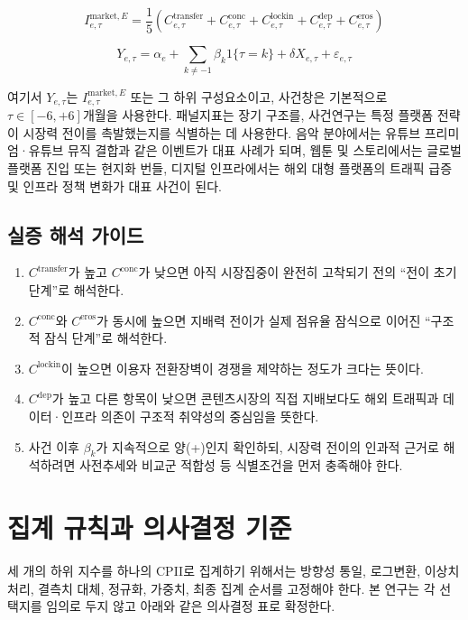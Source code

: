 \documentclass[11pt,a4paper]{report}
\begin{document}
\begin{equation}
\label{eq:imarket_event}
I^{\mathrm{market},E}_{e,\tau} = \frac{1}{5}\left(C^{\mathrm{transfer}}_{e,\tau}+C^{\mathrm{conc}}_{e,\tau}+C^{\mathrm{lockin}}_{e,\tau}+C^{\mathrm{dep}}_{e,\tau}+C^{\mathrm{eros}}_{e,\tau}\right)
\end{equation}

\begin{equation}
\label{eq:imarket_event_study}
Y_{e,\tau} = \alpha_e + \sum_{k \neq -1}\beta_k 1\{\tau = k\} + \delta X_{e,\tau} + \varepsilon_{e,\tau}
\end{equation}

여기서 $Y_{e,\tau}$는 $I^{\mathrm{market},E}_{e,\tau}$ 또는 그 하위 구성요소이고, 사건창은 기본적으로 $\tau \in [-6,+6]$개월을 사용한다. 패널지표는 장기 구조를, 사건연구는 특정 플랫폼 전략이 시장력 전이를 촉발했는지를 식별하는 데 사용한다. 음악 분야에서는 유튜브 프리미엄·유튜브 뮤직 결합과 같은 이벤트가 대표 사례가 되며, 웹툰 및 스토리에서는 글로벌 플랫폼 진입 또는 현지화 번들, 디지털 인프라에서는 해외 대형 플랫폼의 트래픽 급증 및 인프라 정책 변화가 대표 사건이 된다.

\subsection{실증 해석 가이드}
\begin{enumerate}[label=\arabic*.]
  \item $C^{\mathrm{transfer}}$가 높고 $C^{\mathrm{conc}}$가 낮으면 아직 시장집중이 완전히 고착되기 전의 ``전이 초기 단계''로 해석한다.
  \item $C^{\mathrm{conc}}$와 $C^{\mathrm{eros}}$가 동시에 높으면 지배력 전이가 실제 점유율 잠식으로 이어진 ``구조적 잠식 단계''로 해석한다.
  \item $C^{\mathrm{lockin}}$이 높으면 이용자 전환장벽이 경쟁을 제약하는 정도가 크다는 뜻이다.
  \item $C^{\mathrm{dep}}$가 높고 다른 항목이 낮으면 콘텐츠시장의 직접 지배보다도 해외 트래픽과 데이터·인프라 의존이 구조적 취약성의 중심임을 뜻한다.
  \item 사건 이후 $\beta_k$가 지속적으로 양(+)인지 확인하되, 시장력 전이의 인과적 근거로 해석하려면 사전추세와 비교군 적합성 등 식별조건을 먼저 충족해야 한다.
\end{enumerate}

\section{집계 규칙과 의사결정 기준}
세 개의 하위 지수를 하나의 CPII로 집계하기 위해서는 방향성 통일, 로그변환, 이상치 처리, 결측치 대체, 정규화, 가중치, 최종 집계 순서를 고정해야 한다. 본 연구는 각 선택지를 임의로 두지 않고 아래와 같은 의사결정 표로 확정한다.
\end{document}
